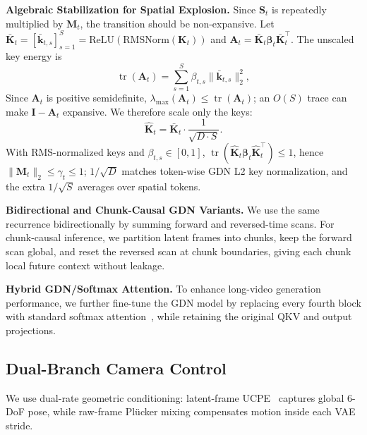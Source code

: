 \noindent \textbf{Algebraic Stabilization for Spatial Explosion.}
Since $\mathbf{S}_t$ is repeatedly multiplied by $\mathbf{M}_t$, the transition should be non-expansive.
Let $\bar{\mathbf{K}}_t=[\bar{\mathbf{k}}_{t,s}]_{s=1}^{S}=\mathrm{ReLU}(\mathrm{RMSNorm}(\mathbf{K}_t))$ and $\mathbf{A}_t=\bar{\mathbf{K}}_t\boldsymbol{\beta}_t\bar{\mathbf{K}}_t^\top$.
The unscaled key energy is
\begin{equation}
\label{eq:gdn_key_mass}
\operatorname{tr}(\mathbf{A}_t)
=\sum_{s=1}^{S}\beta_{t,s}\|\bar{\mathbf{k}}_{t,s}\|_2^2 ,
\end{equation}
Since $\mathbf{A}_t$ is positive semidefinite, $\lambda_{\max}(\mathbf{A}_t)\le\operatorname{tr}(\mathbf{A}_t)$; an $O(S)$ trace can make $\mathbf{I}-\mathbf{A}_t$ expansive.
We therefore scale only the keys:
\begin{equation}
\label{eq:k_scale}
\hat{\mathbf{K}}_t = \bar{\mathbf{K}}_t \cdot \frac{1}{\sqrt{D \cdot S}} .
\end{equation}
With RMS-normalized keys and $\beta_{t,s}\in[0,1]$, $\operatorname{tr}(\hat{\mathbf{K}}_t\boldsymbol{\beta}_t\hat{\mathbf{K}}_t^\top)\le1$, hence $\|\mathbf{M}_t\|_2\le\gamma_t\le1$; $1/\sqrt{D}$ matches token-wise GDN L2 key normalization, and the extra $1/\sqrt{S}$ averages over spatial tokens.

\noindent \textbf{Bidirectional and Chunk-Causal GDN Variants.}
We use the same recurrence bidirectionally by summing forward and reversed-time scans. For chunk-causal inference, we partition latent frames into chunks, keep the forward scan global, and reset the reversed scan at chunk boundaries, giving each chunk local future context without leakage.

\noindent \textbf{Hybrid GDN/Softmax Attention.}
To enhance long-video generation performance, we further fine-tune the GDN model by replacing every fourth block with standard softmax attention~\citep{flash_attention2}, while retaining the original QKV and output projections.


\subsection{Dual-Branch Camera Control}
\label{sec:camera_control}

We use dual-rate geometric conditioning: latent-frame UCPE~\citep{ucpe} captures global 6-DoF pose, while raw-frame Pl\"ucker mixing compensates motion inside each VAE stride.

